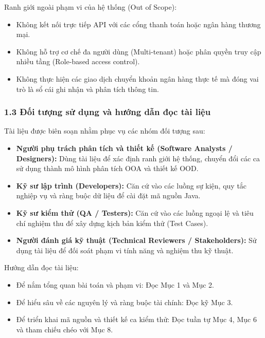 \documentclass[11pt,a4paper]{article}
\providecommand{\tightlist}{
  \setlength{\itemsep}{0pt}\setlength{\parskip}{0pt}}
\begin{document}
Ranh giới ngoài phạm vi của hệ thống (Out of Scope):

\begin{itemize}
\tightlist
\item
  Không kết nối trực tiếp API với các cổng thanh toán hoặc ngân hàng
  thương mại.
\item
  Không hỗ trợ cơ chế đa người dùng (Multi-tenant) hoặc phân quyền truy
  cập nhiều tầng (Role-based access control).
\item
  Không thực hiện các giao dịch chuyển khoản ngân hàng thực tế mà đóng
  vai trò là sổ cái ghi nhận và phân tích thông tin.
\end{itemize}

\subsubsection{1.3 Đối tượng sử dụng và hướng dẫn đọc tài
liệu}\label{13-ux111ux1ed1i-tux1b0ux1ee3ng-sux1eed-dux1ee5ng-vuxe0-hux1b0ux1edbng-dux1eabn-ux111ux1ecdc-tuxe0i-liux1ec7u}

Tài liệu được biên soạn nhằm phục vụ các nhóm đối tượng sau:

\begin{itemize}
\tightlist
\item
  \textbf{Người phụ trách phân tích và thiết kế (Software Analysts /
  Designers):} Dùng tài liệu để xác định ranh giới hệ thống, chuyển đổi
  các ca sử dụng thành mô hình phân tích OOA và thiết kế OOD.
\item
  \textbf{Kỹ sư lập trình (Developers):} Căn cứ vào các luồng sự kiện,
  quy tắc nghiệp vụ và ràng buộc dữ liệu để cài đặt mã nguồn Java.
\item
  \textbf{Kỹ sư kiểm thử (QA / Testers):} Căn cứ vào các luồng ngoại lệ
  và tiêu chí nghiệm thu để xây dựng kịch bản kiểm thử (Test Cases).
\item
  \textbf{Người đánh giá kỹ thuật (Technical Reviewers / Stakeholders):}
  Sử dụng tài liệu để đối soát phạm vi tính năng và nghiệm thu kỹ thuật.
\end{itemize}

Hướng dẫn đọc tài liệu:

\begin{itemize}
\tightlist
\item
  Để nắm tổng quan bài toán và phạm vi: Đọc Mục 1 và Mục 2.
\item
  Để hiểu sâu về các nguyên lý và ràng buộc tài chính: Đọc kỹ Mục 3.
\item
  Để triển khai mã nguồn và thiết kế ca kiểm thử: Đọc tuần tự Mục 4, Mục
  6 và tham chiếu chéo với Mục 8.
\end{itemize}
\end{document}
